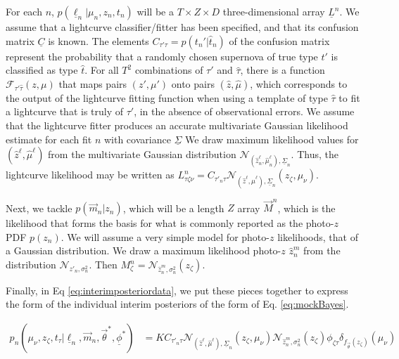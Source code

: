\documentclass[12pt, onecolumn]{emulateapj}
\newcommand{\textul}{\underline}
\begin{document}
For each $n$, $p(\textul{\ell}_{n} | \mu_{n}, z_{n}, t_{n})$ will be a $T\times Z\times D$ three-dimensional array $\textul{L}^{n}$.  We assume that a lightcurve classifier/fitter has been specified, and that its confusion matrix $\textul{C}$ is known.  The elements $C_{\tau'\hat{\tau}} = p(t_{n}' | \hat{t}_{n})$ of the confusion matrix represent the probability that a randomly chosen supernova of true type $t'$ is classified as type $\hat{t}$.  For all $T^{2}$ combinations of $\tau'$ and $\hat{\tau}$, there is a function $\mathcal{F}_{\tau'\hat{\tau}}(z, \mu)$ that maps pairs $(z', \mu')$ onto pairs $(\hat{z}, \hat{\mu})$, which corresponds to the output of the lightcurve fitting function when using a template of type $\hat{\tau}$ to fit a lightcurve that is truly of $\tau'$, in the absence of observational errors.  We assume that the lightcurve fitter produces an accurate multivariate Gaussian likelihood estimate for each fit $n$ with covariance $\textul{\Sigma}$  We draw maximum likelihood values for $(\hat{z}^{\ell}, \hat{\mu}^{\ell})$ from the multivariate Gaussian distribution $\mathcal{N}_{(\hat{z}^{\ell}_{n}, \hat{\mu}^{\ell}_{n}), \textul{\Sigma}_{n}}$.  Thus, the lightcurve likelihood may be written as $L^{n}_{\tau\zeta\nu} = C_{\tau'_{n}\tau}\mathcal{N}_{(\hat{z}^{\ell}, \hat{\mu}^{\ell}), \textul{\Sigma}_{n}}(z_{\zeta}, \mu_{\nu})$.

Next, we tackle $p(\vec{m}_{n} | z_{n})$, which will be a length $Z$ array $\vec{M}^{n}$, which is the likelihood that forms the basis for what is commonly reported as the photo-$z$ PDF $p(z_{n})$.   We will assume a very simple model for photo-$z$ likelihoods, that of a Gaussian distribution.  We draw a maximum likelihood photo-$z$ $\hat{z}_{n}^{m}$ from the distribution $\mathcal{N}_{z'_{n}, \sigma_{n}^{2}}$.  Then $M^{n}_{\zeta}=\mathcal{N}_{\hat{z}_{n}^{m}, \sigma_{n}^{2}}(z_{\zeta})$.

Finally, in Eq \ref{eq:interimposteriordata}, we put these pieces together to express the form of the individual interim posteriors of the form of Eq. \ref{eq:mockBayes}.

\begin{align}
\label{eq:interimposteriordata}
p_{n}(\mu_{\nu}, z_{\zeta}, t_{\tau} | \textul{\ell}_{n}, \vec{m}_{n}, \vec{\theta}^{*}, \textul{\phi}^{*}) &= KC_{\tau'_{n}\tau}\mathcal{N}_{(\hat{z}^{\ell}, \hat{\mu}^{\ell}), \textul{\Sigma}_{n}}(z_{\zeta}, \mu_{\nu}) \mathcal{N}_{\hat{z}_{n}^{m}, \sigma_{n}^{2}}(z_{\zeta}) \phi_{\zeta\tau}\delta_{f_{\vec{\theta}}(z_{\zeta})}(\mu_{\nu})
\end{align}
\end{document}
